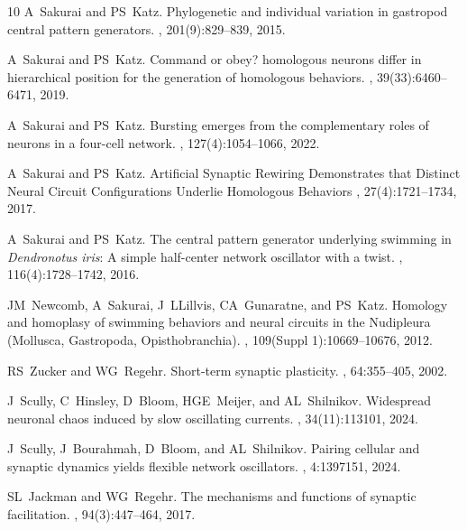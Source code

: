 \documentclass[nofootinbib,aip,amsmath,amssymb,reprint,twocolumn,10pt]{revtex4-2}
\begin{document}
\begin{thebibliography}{10}
A~Sakurai and PS~Katz.
\newblock Phylogenetic and individual variation in gastropod central pattern
  generators.
, 201(9):829--839, 2015.


A~Sakurai and PS~Katz.
\newblock Command or obey? homologous neurons differ in hierarchical position
  for the generation of homologous behaviors.
, 39(33):6460--6471, 2019.

A~Sakurai and PS~Katz.
\newblock Bursting emerges from the complementary roles of neurons in a
  four-cell network.
, 127(4):1054--1066, 2022.

A~Sakurai and PS~Katz.
\newblock Artificial Synaptic Rewiring Demonstrates that Distinct Neural Circuit Configurations
Underlie Homologous Behaviors , 27(4):1721--1734, 2017.


A~Sakurai and PS~Katz.
\newblock  The central pattern generator underlying swimming in \emph{Dendronotus iris}: A simple half-center network oscillator with a twist.
 , 116(4):1728--1742, 2016.


JM~Newcomb, A~Sakurai, J~LLillvis, CA~Gunaratne, and PS~Katz.
\newblock Homology and homoplasy of swimming behaviors and neural circuits in the Nudipleura (Mollusca, Gastropoda, Opisthobranchia).
, 109(Suppl 1):10669--10676, 2012.

RS~Zucker and WG~Regehr.
\newblock Short-term synaptic plasticity.
, 64:355--405, 2002.

J~Scully, C~Hinsley, D~Bloom, HGE~Meijer, and AL~Shilnikov.
\newblock Widespread neuronal chaos induced by slow oscillating currents.
, 34(11):113101, 2024.

J~Scully, J~Bourahmah, D~Bloom, and AL~Shilnikov.
\newblock Pairing cellular and synaptic dynamics yields flexible network oscillators.
, 4:1397151, 2024.

SL~Jackman and WG~Regehr.
\newblock The mechanisms and functions of synaptic facilitation.
, 94(3):447--464, 2017.


\end{thebibliography}
\end{document}
